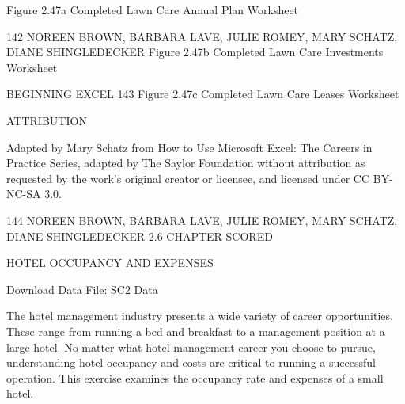 Figure 2.47a Completed Lawn Care Annual Plan Worksheet


142 NOREEN BROWN, BARBARA LAVE, JULIE ROMEY, MARY SCHATZ, DIANE SHINGLEDECKER
Figure 2.47b Completed Lawn Care Investments Worksheet




BEGINNING EXCEL 143
Figure 2.47c Completed Lawn Care Leases Worksheet


ATTRIBUTION

Adapted by Mary Schatz from How to Use Microsoft Excel: The Careers in Practice Series, adapted
by The Saylor Foundation without attribution as requested by the work’s original creator or
licensee, and licensed under CC BY-NC-SA 3.0.




144 NOREEN BROWN, BARBARA LAVE, JULIE ROMEY, MARY SCHATZ, DIANE SHINGLEDECKER
2.6 CHAPTER SCORED




HOTEL OCCUPANCY AND EXPENSES

Download Data File: SC2 Data

The hotel management industry presents a wide variety of career opportunities. These range from
running a bed and breakfast to a management position at a large hotel. No matter what hotel
management career you choose to pursue, understanding hotel occupancy and costs are critical to
running a successful operation. This exercise examines the occupancy rate and expenses of a small
hotel.

